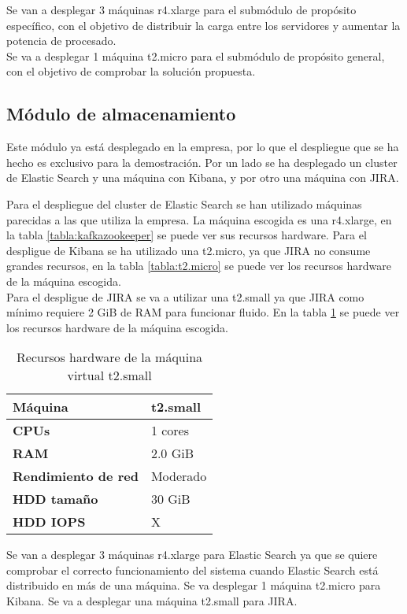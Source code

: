 Se van a desplegar 3 máquinas r4.xlarge para el submódulo de propósito específico, con el objetivo de distribuir la carga entre los servidores y aumentar la potencia de procesado.
\\
Se va a desplegar 1 máquina t2.micro para el submódulo de propósito general, con el objetivo de comprobar la solución propuesta.

\subsection{Módulo de almacenamiento}
Este módulo ya está desplegado en la empresa, por lo que el despliegue que se ha hecho es exclusivo para la demostración. Por un lado se ha desplegado un cluster de Elastic Search y una máquina con Kibana, y por otro una máquina con JIRA.

Para el despliegue del cluster de Elastic Search se han utilizado máquinas parecidas a las que utiliza la empresa. La máquina escogida es una r4.xlarge, en la tabla \ref{tabla:kafkazookeeper} se puede ver sus recursos hardware. Para el despligue de Kibana se ha utilizado una t2.micro, ya que JIRA no consume grandes recursos, en la tabla \ref{tabla:t2.micro} se puede ver los recursos hardware de la máquina escogida.
\\
Para el despligue de JIRA se va a utilizar una t2.small ya que JIRA como mínimo requiere 2 GiB de RAM para funcionar fluido. En la tabla \ref{tabla:t2.small} se puede ver los recursos hardware de la máquina escogida.

\begin{table}[H]\label{tabla:t2.small}
	\centering
	\begin{tabular}{|l|l|}
		\hline
		\textbf{Máquina}            & \textbf{t2.small}      \\ \hline
		\textbf{CPUs}               & 1 cores                \\ \hline
		\textbf{RAM}                & 2.0 GiB                \\ \hline
		\textbf{Rendimiento de red} & Moderado               \\ \hline
		\textbf{HDD tamaño}         & 30 GiB                 \\ \hline
		\textbf{HDD IOPS}           & X                      \\ \hline
	\end{tabular}
	\caption{Recursos hardware de la máquina virtual t2.small}
\end{table}

Se van a desplegar 3 máquinas r4.xlarge para Elastic Search ya que se quiere comprobar el correcto funcionamiento del sistema cuando Elastic Search está distribuido en más de una máquina. Se va desplegar 1 máquina t2.micro para Kibana. Se va a desplegar una máquina t2.small para JIRA.

